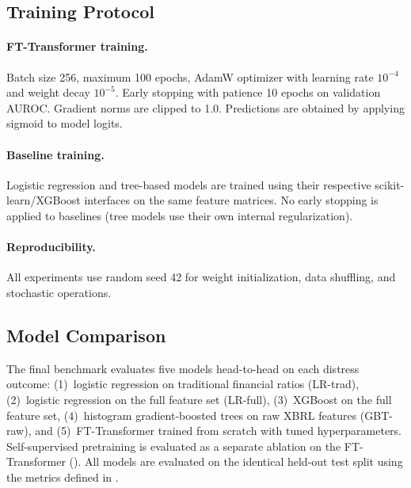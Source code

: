 \subsection{Training Protocol}
\label{sec:training}

\paragraph{FT-Transformer training.} Batch size 256, maximum 100 epochs, AdamW optimizer with learning rate $10^{-4}$ and weight decay $10^{-5}$. Early stopping with patience 10 epochs on validation AUROC. Gradient norms are clipped to 1.0. Predictions are obtained by applying sigmoid to model logits.

\paragraph{Baseline training.} Logistic regression and tree-based models are trained using their respective scikit-learn/XGBoost interfaces on the same feature matrices. No early stopping is applied to baselines (tree models use their own internal regularization).

\paragraph{Reproducibility.} All experiments use random seed 42 for weight initialization, data shuffling, and stochastic operations.

\subsection{Model Comparison}
\label{sec:comparison}

The final benchmark evaluates five models head-to-head on each distress outcome: (1)~logistic regression on traditional financial ratios (LR-trad), (2)~logistic regression on the full feature set (LR-full), (3)~XGBoost on the full feature set, (4)~histogram gradient-boosted trees on raw XBRL features (GBT-raw), and (5)~FT-Transformer trained from scratch with tuned hyperparameters. Self-supervised pretraining is evaluated as a separate ablation on the FT-Transformer (). All models are evaluated on the identical held-out test split using the metrics defined in .
